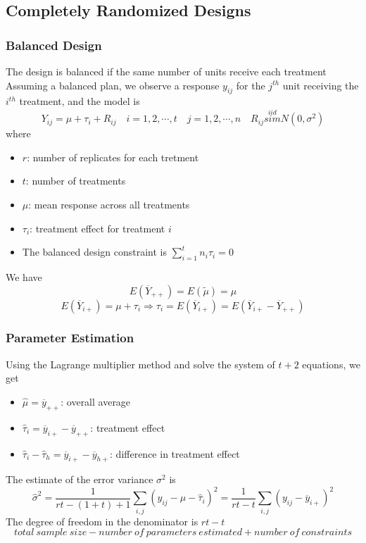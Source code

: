 \documentclass[11pt]{article}
\begin{document}
\subsection{Completely Randomized Designs}
\subsubsection{Balanced Design}
The design is balanced if the same number of units receive each treatment \\
Assuming a balanced plan, we observe a response $y_{ij}$ for the $j^{th}$ unit receiving the $i^{th}$ treatment, and the model is
\[Y_{ij}=\mu+\tau_i+R_{ij}\quad i=1,2,\cdots,t\quad j=1,2,\cdots,n\quad R_{ij}\overset{iid}{sim}N(0,\sigma^2)\]
where
\begin{itemize}
    \item $r$: number of replicates for each tretment 
    \item $t$: number of treatments
    \item $\mu$: mean response across all treatments 
    \item $\tau_i$: treatment effect for treatment $i$
    \item The balanced design constraint is $\sum_{i=1}^{t}n_i\tau_i=0$
\end{itemize}
We have 
\[E(\overline{Y}_{++}) = E(\tilde{\mu}) = \mu\]
\[E(\overline{Y}_{i+}) = \mu+\tau_i\Rightarrow\tau_i = E(\overline{Y}_{i+})=E(\overline{Y}_{i+}-\overline{Y}_{++})\]
\subsubsection{Parameter Estimation}
Using the Lagrange multiplier method and solve the system of $t+2$ equations, we get 
\begin{itemize}
    \item $\hat\mu=\overline{y}_{++}$: overall average 
    \item $\hat\tau_i=\overline{y}_{i+}-\overline{y}_{++}$: treatment effect
    \item $\hat\tau_i-\hat\tau_h = \overline{y}_{i+}-\overline{y}_{h+}$: difference in treatment effect
\end{itemize}
The estimate of the error variance $\sigma^2$ is 
\[\hat\sigma^2 = \frac{1}{rt-(1+t)+1}\sum_{i,j}(y_{ij}-\hat\mu-\hat\tau_i)^2 = \frac{1}{rt-t}\sum_{i,j}(y_{ij}-\overline{y}_{i+})^2\]
The degree of freedom in the denominator is $rt-t$
\[total\ sample\ size - number\ of\ parameters\ estimated + number\ of\ constraints\]
\end{document}

